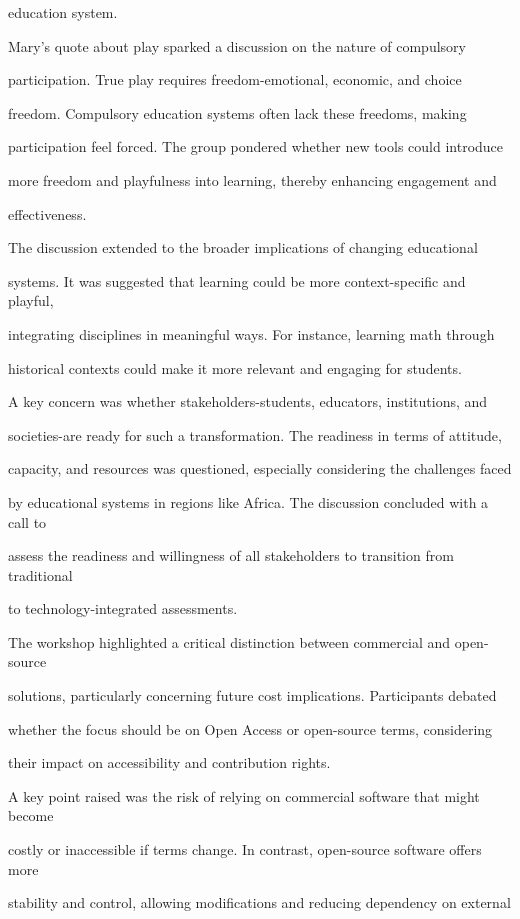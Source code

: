 \documentclass[11pt]{article}
\begin{document}
education system.

Mary's quote about play sparked a discussion on the nature of compulsory

participation. True play requires freedom-emotional, economic, and choice

freedom. Compulsory education systems often lack these freedoms, making

participation feel forced. The group pondered whether new tools could introduce

more freedom and playfulness into learning, thereby enhancing engagement and

effectiveness.

The discussion extended to the broader implications of changing educational

systems. It was suggested that learning could be more context-specific and playful,

integrating disciplines in meaningful ways. For instance, learning math through

historical contexts could make it more relevant and engaging for students.

A key concern was whether stakeholders-students, educators, institutions, and

societies-are ready for such a transformation. The readiness in terms of attitude,

capacity, and resources was questioned, especially considering the challenges faced

by educational systems in regions like Africa. The discussion concluded with a call to

assess the readiness and willingness of all stakeholders to transition from traditional

to technology-integrated assessments.

The workshop highlighted a critical distinction between commercial and open-source

solutions, particularly concerning future cost implications. Participants debated

whether the focus should be on Open Access or open-source terms, considering

their impact on accessibility and contribution rights.

A key point raised was the risk of relying on commercial software that might become

costly or inaccessible if terms change. In contrast, open-source software offers more

stability and control, allowing modifications and reducing dependency on external
\end{document}
